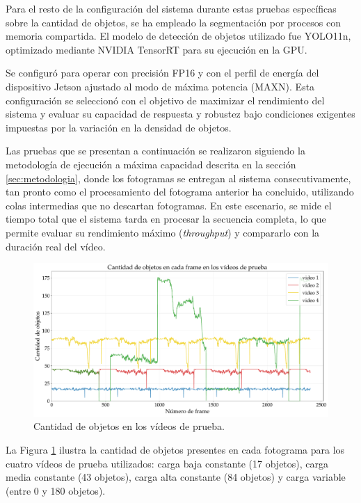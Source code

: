 \documentclass[11pt,spanish,listoffigures,listoftables]{tfgetsinf}
\begin{document}
Para el resto de la configuración del sistema durante estas pruebas específicas sobre la cantidad de objetos, se ha empleado la segmentación por procesos con memoria compartida. El modelo de detección de objetos utilizado fue YOLO11n, optimizado mediante NVIDIA TensorRT para su ejecución en la GPU.

Se configuró para operar con precisión FP16 y con el perfil de energía del dispositivo Jetson ajustado al modo de máxima potencia (MAXN). Esta configuración se seleccionó con el objetivo de maximizar el rendimiento del sistema y evaluar su capacidad de respuesta y robustez bajo condiciones exigentes impuestas por la variación en la densidad de objetos.

Las pruebas que se presentan a continuación se realizaron siguiendo la metodología de ejecución a máxima capacidad descrita en la sección \ref{sec:metodologia}, donde los fotogramas se entregan al sistema consecutivamente, tan pronto como el procesamiento del fotograma anterior ha concluido, utilizando colas intermedias que no descartan fotogramas. En este escenario, se mide el tiempo total que el sistema tarda en procesar la secuencia completa, lo que permite evaluar su rendimiento máximo (\textit{throughput}) y compararlo con la duración real del vídeo.

\begin{figure}[H]
   \centering
   \includegraphics[width=\linewidth]{excels/inferencia/cantidad_objetos/cantidad_objetos_videos.pdf}
   \caption[Cantidad de objetos en los vídeos de prueba]{Cantidad de objetos en los vídeos de prueba.}
   \label{fig:4_videos}
\end{figure}

La Figura \ref{fig:4_videos} ilustra la cantidad de objetos presentes en cada fotograma para los cuatro vídeos de prueba utilizados: carga baja constante (17 objetos), carga media constante (43 objetos), carga alta constante (84 objetos) y carga variable (entre 0 y 180 objetos).
\end{document}
